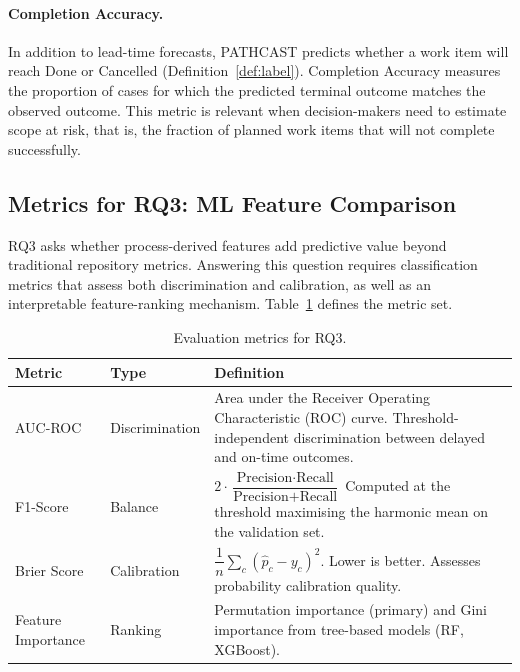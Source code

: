 \paragraph{Completion Accuracy.}
In addition to lead-time forecasts, PATHCAST predicts whether a work
item will reach Done or Cancelled (Definition~\ref{def:label}).
Completion Accuracy measures the proportion of cases for which the
predicted terminal outcome matches the observed outcome.
This metric is relevant when decision-makers need to estimate scope at
risk, that is, the fraction of planned work items that will not
complete successfully.
 
\subsection{Metrics for RQ3: ML Feature Comparison}
\label{sec:metrics-rq3}
 
RQ3 asks whether process-derived features add predictive value
beyond traditional repository metrics.
Answering this question requires classification metrics that
assess both discrimination and calibration, as well as an
interpretable feature-ranking mechanism.
Table~\ref{tab:metrics-rq3} defines the metric set.
 
\begin{table}[ht]
\centering
\caption{Evaluation metrics for RQ3.}
\label{tab:metrics-rq3}
\small
\begin{tabular}{@{}l l p{7.4cm}@{}}
\toprule
\textbf{Metric} & \textbf{Type} & \textbf{Definition} \\
\midrule
AUC-ROC &
  Discrimination &
  Area under the Receiver Operating Characteristic (ROC) curve.
  Threshold-independent discrimination between delayed and
  on-time outcomes. \\[4pt]
F1-Score &
  Balance &
  $2 \cdot \dfrac{\text{Precision} \cdot \text{Recall}}
                  {\text{Precision} + \text{Recall}}$
  Computed at the threshold maximising the harmonic mean on the
  validation set. \\[8pt]
Brier Score &
  Calibration &
  $\dfrac{1}{n}\displaystyle\sum_c (\hat{p}_c - y_c)^2$.
  Lower is better. Assesses probability calibration quality. \\[6pt]
Feature Importance &
  Ranking &
  Permutation importance (primary) and Gini importance from
  tree-based models (RF, XGBoost). \\
\bottomrule
\end{tabular}
\end{table}
 
